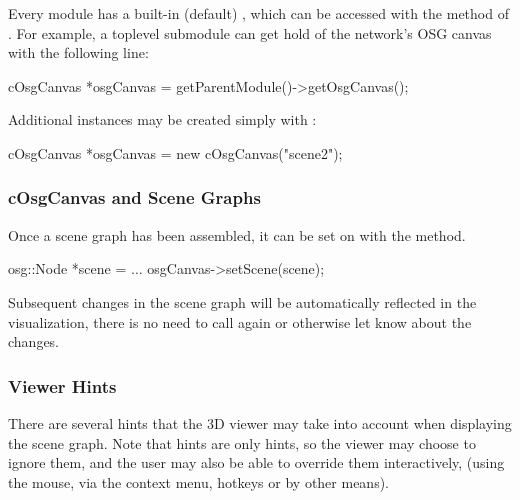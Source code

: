 Every module has a built-in (default) , which can be
accessed with the  method of .
For example, a toplevel submodule can get hold of the network's
OSG canvas with the following line:

\begin{cpp}
cOsgCanvas *osgCanvas = getParentModule()->getOsgCanvas();
\end{cpp}

Additional  instances may be created simply with :

\begin{cpp}
cOsgCanvas *osgCanvas = new cOsgCanvas("scene2");
\end{cpp}

\subsubsection{cOsgCanvas and Scene Graphs}
\label{sec:graphics:osgcanvas-and-scene-graphs}

Once a scene graph has been assembled, it can be set on 
with the  method.

\begin{cpp}
osg::Node *scene = ...
osgCanvas->setScene(scene);
\end{cpp}

Subsequent changes in the scene graph will be automatically reflected in
the visualization, there is no need to call  again or
otherwise let {\opp} know about the changes.


\subsubsection{Viewer Hints}
\label{sec:graphics:osgcanvas-viewer-hints}

There are several hints that the 3D viewer may take into account when displaying
the scene graph. Note that hints are only hints, so the viewer may choose to
ignore them, and the user may also be able to override them interactively,
(using the mouse, via the context menu, hotkeys or by other means).

